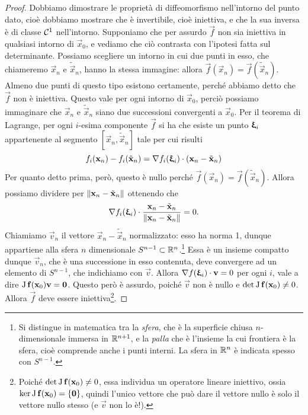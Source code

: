 \begin{proof}
	Dobbiamo dimostrare le proprietà di diffeomorfismo nell'intorno del punto dato, cioè dobbiamo mostrare che è invertibile, cioè iniettiva, e che la sua inversa è di classe $\mathcal{C}^{{1}}$ nell'intorno.
	Supponiamo che per assurdo $\vec f$ non sia iniettiva in qualsiasi intorno di $\vec x_0$, e vediamo che ciò contrasta con l'ipotesi fatta sul determinante.
	Possiamo scegliere un intorno in cui due punti in esso, che chiameremo $\vec x_n$ e $\tilde{\vec x}_n$, hanno la stessa immagine: allora $\vec f(\vec x_n)=\vec f(\tilde{\vec x}_n)$.
	Almeno due punti di questo tipo esistono certamente, perch\'e abbiamo detto che $\vec f$ non è iniettiva.
	Questo vale per ogni intorno di $\vec x_0$, perciò possiamo immaginare che $\vec x_n$ e $\tilde{\vec x}_n$ siano due successioni convergenti a $\vec x_0$.
	Per il teorema di Lagrange, per ogni $i$-esima componente $\vec f$ si ha che esiste un punto $\bm{\upxi}_i$ appartenente al segmento $[\vec x_n, \tilde{\vec x}_n]$ tale per cui risulti
	\begin{equation}
		f_i(\mathbf{x}_n)-f_i(\tilde{\mathbf{x}}_n)={\nabla f_i(\bm{\upxi}_i)}\cdot{(\mathbf{x}_n-\tilde{\mathbf{x}}_n)}
		\label{eq:lagrange-in-diffeomorfismo-locale}
	\end{equation}
	Per quanto detto prima, però, questo è nullo perché $\vec f(\vec x_n)=\vec f(\tilde{\vec x}_n)$.
	Allora possiamo dividere per $\left\|{\mathbf{x}_n-\tilde{\mathbf{x}}_n}\right\|$ ottenendo che
	\begin{equation}
		{\nabla f_i(\bm{\upxi}_i)}\cdot{\frac{\mathbf{x}_n-\tilde{\mathbf{x}}_n}{\left\|{\mathbf{x}_n-\tilde{\mathbf{x}}_n}\right\|}}=0.
		\label{eq:vettori-ortogonali-diffeomorfismo}
	\end{equation}
	Chiamiamo $\vec v_n$ il vettore $\vec x_n-\tilde{\vec x}_n$ normalizzato: esso ha norma 1, dunque appartiene alla sfera $n$ dimensionale $S^{n-1}\subset\mathbb{R}^n$.\footnote{Si distingue in matematica tra la \emph{sfera}, che è la superficie chiusa $n$-dimensionale immersa in $\mathbb{R}^{n+1}$, e la \emph{palla} che è l'insieme la cui frontiera è la sfera, cioè comprende anche i punti interni. La sfera in $\mathbb{R}^n$ è indicata spesso con $S^{n-1}$.}
	Essa è un insieme compatto dunque $\vec v_n$, che è una successione in esso contenuta, deve convergere ad un elemento di $S^{n-1}$, che indichiamo con $\vec v$.
	Allora ${\nabla f(\bm{\upxi}_i)}\cdot{\mathbf{v}}=0$ per ogni $i$, vale a dire $\operatorname{J}\mathbf{f}(\mathbf{x}_0)\mathbf{v}=\mathbf{0}$.
	Questo però è assurdo, poiché $\vec v$ non è nullo e $\det\operatorname{J}\mathbf{f}(\mathbf{x}_0)\neq 0$.
	Allora $\vec f$ deve essere iniettiva\footnote{Poiché $\det\operatorname{J}\mathbf{f}(\mathbf{x}_0)\neq 0$, essa individua un operatore lineare iniettivo, ossia $\ker\operatorname{J}\mathbf{f}(\mathbf{x}_0)=\{\mathbf{0}\}$, quindi l'unico vettore che può dare il vettore nullo è solo il vettore nullo stesso (e $\vec v$ non lo è!).}.


\end{proof}
